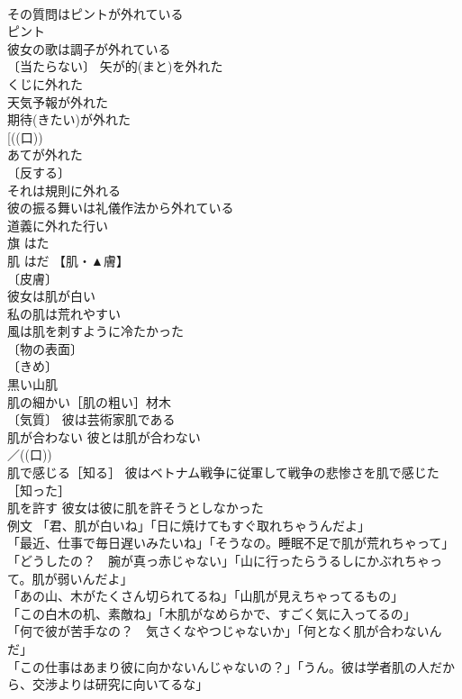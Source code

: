 \documentclass[8pt]{extreport}
\begin{document}
\begin{CJK}{UTF8}{min}
\\	その質問はピントが外れている 
\\	ピント　
\\	彼女の歌は調子が外れている 
\\	〔当たらない〕 矢が的(まと)を外れた 
\\	くじに外れた 
\\	天気予報が外れた 
\\	期待(きたい)が外れた 
\\	[((口)) 
\\	あてが外れた 
\\	〔反する〕
\\	それは規則に外れる 
\\	彼の振る舞いは礼儀作法から外れている 
\\	道義に外れた行い 
\\	旗	はた	
\\	肌	はだ	【肌・▲膚】 
\\	〔皮膚〕
\\	彼女は肌が白い 
\\	私の肌は荒れやすい 
\\	風は肌を刺すように冷たかった 
\\	〔物の表面〕
\\	〔きめ〕
\\	黒い山肌 
\\	肌の細かい［肌の粗い］材木 
\\	〔気質〕 彼は芸術家肌である 
\\	肌が合わない 彼とは肌が合わない 
\\	／((口)) 
\\	肌で感じる［知る］ 彼はベトナム戦争に従軍して戦争の悲惨さを肌で感じた［知った］ 
\\	肌を許す 彼女は彼に肌を許そうとしなかった 
\\	例文 「君、肌が白いね」「日に焼けてもすぐ取れちゃうんだよ」 
\\	「最近、仕事で毎日遅いみたいね」「そうなの。睡眠不足で肌が荒れちゃって」 
\\	「どうしたの？　腕が真っ赤じゃない」「山に行ったらうるしにかぶれちゃって。肌が弱いんだよ」 
\\	「あの山、木がたくさん切られてるね」「山肌が見えちゃってるもの」 
\\	「この白木の机、素敵ね」「木肌がなめらかで、すごく気に入ってるの」 
\\	「何で彼が苦手なの？　気さくなやつじゃないか」「何となく肌が合わないんだ」 
\\	「この仕事はあまり彼に向かないんじゃないの？」「うん。彼は学者肌の人だから、交渉よりは研究に向いてるな」 

\end{CJK}
\end{document}
